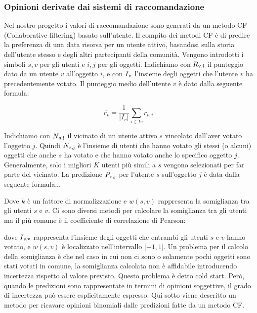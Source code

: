 \documentclass{report}
\begin{document}
	\hypertarget{header-n108}{%
		\subsubsection{Opinioni derivate dai sistemi di
			raccomandazione}\label{header-n108}}
	
	Nel nostro progetto i valori di raccomandazione sono generati da un
	metodo CF (Collaborative filtering) basato sull'utente. Il compito dei
	metodi CF è di predire la preferenza di una data risorsa per un utente
	attivo, basandosi sulla storia dell'utente stesso e degli altri
	partecipanti della comunità. Vengono introdotti i simboli $s,v$ per gli
	utenti e $i,j$ per gli oggetti. Indichiamo con $R\textsubscript{v,i}$ il punteggio dato da
	un utente $v$ all'oggetto $i$, e con $I\textsubscript{v}$ l'insieme degli oggetti che l'utente
	$v$ ha precedentemente votato. Il punteggio medio dell'utente $v$ è dato
	dalla seguente formula:
	
	\begin{center}
	\begin{equation}
		\overline{r_v}=\frac{1}{|I_v|} \sum_{i \in Iv} r_{v,i}
		\label{equazione5}
	\end{equation}
	\end{center}
	
	Indichiamo con $N\textsubscript{s,j}$ il vicinato di un utente attivo $s$ vincolato
	dall'aver votato l'oggetto $j$. Quindi $N\textsubscript{s,j}$ è l'insieme di utenti che
	hanno votato gli stessi (o alcuni) oggetti che anche $s$ ha votato e che
	hanno votato anche lo specifico oggetto $j$. Generalmente, solo i migliori
	$K$ utenti più simili a $s$ vengono selezionati per far parte del vicinato.
	La predizione $P\textsubscript{s,j}$ per l'utente $s$ sull'oggetto $j$ è data dalla seguente
	formula...
	
	Dove $k$ è un fattore di normalizzazione e $w(s,v)$ rappresenta la
	somiglianza tra gli utenti $s$ e $v$. Ci sono diversi metodi per calcolare
	la somiglianza tra gli utenti ma il più comune è il coefficiente di
	correlazione di Pearson:
	
	dove $I\textsubscript{s,v}$ rappresenta l'insieme degli oggetti che entrambi gli utenti $s$
	e $v$ hanno votato, e $w(s,v)$ è localizzato nell'intervallo ${[}-1,1{]}$. Un
	problema per il calcolo della somiglianza è che nel caso in cui non ci
	sono o solamente pochi oggetti sono stati votati in comune, la
	somiglianza calcolata non è affidabile introducendo incertezza rispetto
	al valore previsto. Questo problema è detto cold start. Però, quando le
	predizioni sono rappresentate in termini di opinioni soggettive, il
	grado di incertezza può essere esplicitamente espresso. Qui sotto viene
	descritto un metodo per ricavare opinioni binomiali dalle predizioni
	fatte da un metodo CF.
	
\end{document}

